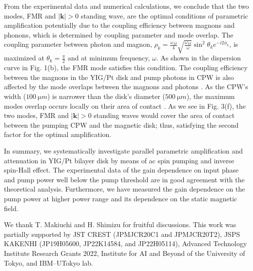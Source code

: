 \documentclass[%
 reprint,
 amsmath,amssymb,
 aps,
prb,
]{revtex4-2}
\begin{document}
From the experimental data and numerical calculations, we conclude that the two modes, FMR and $|\mathbf{k}| > 0$ standing wave, are the optimal conditions of parametric amplification  potentially due to the coupling efficiency between magnons and phonons, which is determined by coupling parameter and mode overlap. The coupling parameter between photon and magnon, $\rho_k=\frac{\omega_M}{4} \sqrt{\frac{\omega_M}{\omega}}\sin^2{\theta_ke^{-i2\phi_k}}$, is maximized at $\theta_k=\frac{\pi}{2}$ and at minimum frequency, $\omega$. As shown in the dispersion curve in Fig. 1(b), the FMR mode satisfies this condition. The coupling efficiency between the magnons in the YIG/Pt disk and pump photons in CPW is also affected by the mode overlaps between the magnons and photons \cite{Huebl2013,Zhang2014,Zhang2015}. As the CPW’s width ($100\ \si{\micro m}$) is narrower than the disk’s diameter ($500\ \si{\micro m}$), the maximum modes overlap occurs locally on their area of contact \cite{Zhang2014}. As we see in Fig. 3(f), the two modes, FMR and $|\mathbf{k}| > 0$ standing waves would cover the area of contact between the pumping CPW and the magnetic disk; thus, satisfying the second factor for the optimal amplification. 

In summary, we systematically investigate parallel parametric amplification and attenuation in YIG/Pt bilayer disk by means of ac spin pumping and inverse spin-Hall effect. The experimental data of the gain dependence on input phase and pump power well below the pump threshold are in good agreement with the theoretical analysis. Furthermore, we have measured the gain dependence on the pump power at higher power range and its dependence on the static magnetic field.

\begin{acknowledgments}
We thank T. Makiuchi and H. Shimizu for fruitful discussions. This work was partially supported by JST CREST (JPMJCR20C1 and JPMJCR20T2), JSPS KAKENHI (JP19H05600, JP22K14584, and JP22H05114), Advanced Technology Institute Research Grants 2022, Institute for AI and Beyond of the University of Tokyo, and IBM–UTokyo lab.
\end{acknowledgments}


\end{document}
